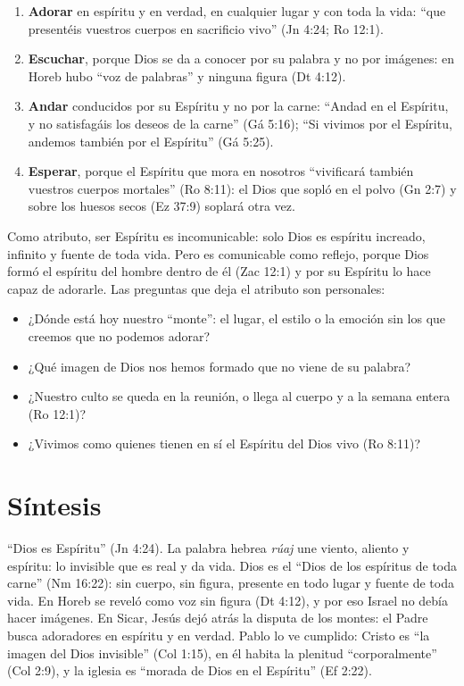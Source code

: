 \begin{enumerate}
\item \textbf{Adorar} en espíritu y en verdad, en cualquier lugar y con toda la vida: ``que presentéis vuestros cuerpos en sacrificio vivo'' (Jn 4:24; Ro 12:1).
\item \textbf{Escuchar}, porque Dios se da a conocer por su palabra y no por imágenes: en Horeb hubo ``voz de palabras'' y ninguna figura (Dt 4:12).
\item \textbf{Andar} conducidos por su Espíritu y no por la carne: ``Andad en el Espíritu, y no satisfagáis los deseos de la carne'' (Gá 5:16); ``Si vivimos por el Espíritu, andemos también por el Espíritu'' (Gá 5:25).
\item \textbf{Esperar}, porque el Espíritu que mora en nosotros ``vivificará también vuestros cuerpos mortales'' (Ro 8:11): el Dios que sopló en el polvo (Gn 2:7) y sobre los huesos secos (Ez 37:9) soplará otra vez.
\end{enumerate}

Como atributo, ser Espíritu es incomunicable: solo Dios es espíritu increado, infinito y fuente de toda vida. Pero es comunicable como reflejo, porque Dios formó el espíritu del hombre dentro de él (Zac 12:1) y por su Espíritu lo hace capaz de adorarle. Las preguntas que deja el atributo son personales:

\begin{itemize}
\item ¿Dónde está hoy nuestro ``monte'': el lugar, el estilo o la emoción sin los que creemos que no podemos adorar?
\item ¿Qué imagen de Dios nos hemos formado que no viene de su palabra?
\item ¿Nuestro culto se queda en la reunión, o llega al cuerpo y a la semana entera (Ro 12:1)?
\item ¿Vivimos como quienes tienen en sí el Espíritu del Dios vivo (Ro 8:11)?
\end{itemize}

\section{Síntesis}

\begin{tcolorbox}[colback=papiro,colframe=azul,boxrule=1pt,arc=3pt]
``Dios es Espíritu'' (Jn 4:24). La palabra hebrea \emph{rúaj} une viento, aliento y espíritu: lo invisible que es real y da vida. Dios es el ``Dios de los espíritus de toda carne'' (Nm 16:22): sin cuerpo, sin figura, presente en todo lugar y fuente de toda vida. En Horeb se reveló como voz sin figura (Dt 4:12), y por eso Israel no debía hacer imágenes. En Sicar, Jesús dejó atrás la disputa de los montes: el Padre busca adoradores en espíritu y en verdad. Pablo lo ve cumplido: Cristo es ``la imagen del Dios invisible'' (Col 1:15), en él habita la plenitud ``corporalmente'' (Col 2:9), y la iglesia es ``morada de Dios en el Espíritu'' (Ef 2:22).
\end{tcolorbox}

